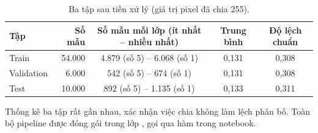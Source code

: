 \begin{table}[H]
  \centering
  \caption{Ba tập sau tiền xử lý (giá trị pixel đã chia 255).}
  \label{tab:split}
  \small
  \begin{tabular}{lrccc}
    \toprule
    Tập & Số mẫu & Số mẫu mỗi lớp (ít nhất -- nhiều nhất) & Trung bình & Độ lệch chuẩn \\
    \midrule
    Train      & 54.000 & 4.879 (số 5) -- 6.068 (số 1) & 0,131 & 0,308 \\
    Validation & 6.000  & 542 (số 5) -- 674 (số 1)     & 0,131 & 0,308 \\
    Test       & 10.000 & 892 (số 5) -- 1.135 (số 1)   & 0,133 & 0,311 \\
    \bottomrule
  \end{tabular}
\end{table}

Thống kê ba tập rất gần nhau, xác nhận việc chia không làm lệch phân bố. Toàn bộ pipeline được đóng gói trong lớp , gọi qua hàm  trong notebook.